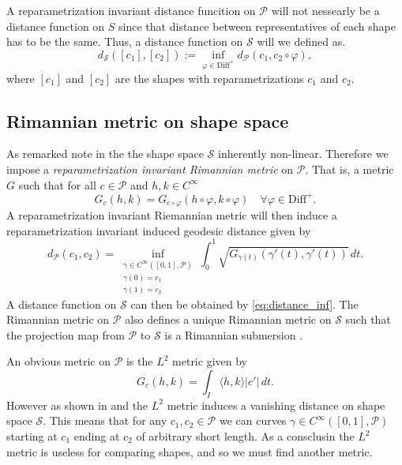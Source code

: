 A reparametrization invariant distance funcition on \(\mathcal{P}\) will not nessearly be a distance function on \(S\) since  that distance between representatives of each shape has to be the same. Thus, a distance function on \(\mathcal{S}\) will we defined as. 
\begin{equation}
  d_\mathcal{S} ([c_1],[c_2]) := \inf_{\varphi \in \text{Diff}^+}{  d_{\mathcal{P}}(c_1,c_2 \circ \varphi)},
  \label{eq:distance_inf}
\end{equation} 
where  \([c_1]\) and  \([c_2]\) are the shapes with reparametrizations \(c_1\) and  \(c_2\). 

\subsection{Rimannian metric on shape space}
As remarked note in \cite{bauer2014overview} the the shape space \(\mathcal{S}\) inherently non-linear. Therefore we impose a \emph{reparametrization invariant Rimannian metric}  on \(\mathcal{P}\). That is, a metric \(G\) such that for all \( c \in \mathcal{P}\) and \(h,k \in C^\infty\)
\begin{equation}
  G_c(h,k) = G_{c \circ \varphi}(h\circ \varphi, k \circ \varphi) \quad \forall \varphi \in \text{Diff}^+.
\end{equation}
A reparametrization invariant Riemannian metric will then induce a reparametrization invariant induced geodesic distance given by 
\begin{equation}
  d_\mathcal{P}(c_1, c_2) = \inf_{
    \substack{
      \gamma \in C^{\infty}([0,1], \mathcal{P}) \\ 
      \gamma(0) = c_1 \\
      \gamma(1) = c_2
    }
  } \int_0^1 \sqrt{G_{\gamma(t)}(\gamma'(t),\gamma'(t))} \, dt.
\end{equation}
A distance function on \(\mathcal{S}\) can then be obtained by \eqref{eq:distance_inf}. The Rimannian metric on \(\mathcal{P}\) also defines a unique Rimannian metric on \(\mathcal{S}\) such that the projection map from \(\mathcal{P}\)  to \(\mathcal{S}\) is a Rimannian submersion \cite[6]{bauer2014_rprop}. 

An obvious metric on \(\mathcal{P}\) is the \(L^2\) metric  given by 
\begin{equation}
  G_c(h,k) = \int_I \langle h, k\rangle \vert c'\vert \,dt. 
\end{equation}
However as shown in \cite{michor2003vanishingl2} and \cite{michor2004vanishing_generalized} the \(L^2\) metric induces a vanishing distance on shape space \(\mathcal{S}\). This means that for any \(c_1, c_2 \in \mathcal{P}\) we can curves \(\gamma \in C^{\infty}([0,1],\mathcal{P})\) starting at \(c_1\) ending at \(c_2\) of arbitrary short length. As a consclusin the \(L^2\) metric is useless for comparing shapes, and so we must find another metric. 

